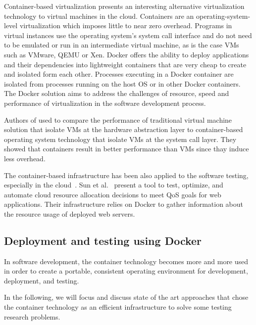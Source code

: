 Container-based virtualization presents an interesting alternative virtualization technology to virtual machines in the cloud. Containers are an operating-system-level virtualization which imposes little to near zero overhead. Programs in virtual instances use the operating system's system call interface and do not need to be emulated or run in an intermediate virtual machine, as is the case VMs such as VMware, QEMU or Xen.
Docker offers the ability to deploy applications and their dependencies into lightweight containers that are very cheap to create and isolated form each other. Processes executing in a Docker container are isolated from processes running on the host OS or in other Docker containers. The Docker solution aims to address the challenges of resource, speed and performance of virtualization in the software development process. 

Authors of \cite{spoiala2016performance,soltesz2007container,merkel2014docker,felter2015updated} used to compare the performance of traditional virtual machine solution that isolate VMs at the hardware abstraction layer to container-based operating system technology that isolate VMs at the system call layer. They showed that containers result in better performance than VMs since thay induce less overhead. 


The container-based infrastructure has been also applied to the software testing, especially in the cloud~\cite{li2015rest}. Sun et al.~\cite{sun2016roar} present a tool to test, optimize, and automate cloud resource allocation decisions to meet QoS goals for web applications. Their infrastructure relies on Docker to gather information about the resource usage of deployed web servers. 

\subsection{Deployment and testing using Docker}  
In software development, the container technology becomes more and more used in order to create a portable, consistent operating environment for development, deployment, and testing.

In the following, we will focus and discuss state of the art approaches that chose the container technology as an efficient infrastructure to solve some testing research problems. 



